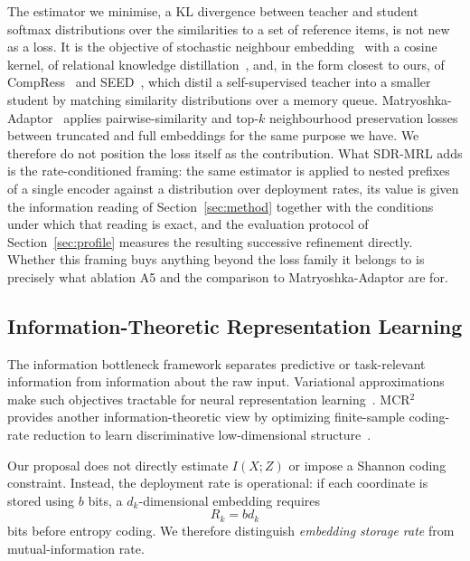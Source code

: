 \documentclass[11pt]{article}
\begin{document}
The estimator we minimise, a KL divergence between teacher and student softmax distributions over the similarities to a set of reference items, is not new as a loss.
It is the objective of stochastic neighbour embedding~\cite{hinton2002sne} with a cosine kernel, of relational knowledge distillation~\cite{park2019relational}, and, in the form closest to ours, of CompRess~\cite{koohpayegani2020compress} and SEED~\cite{fang2021seed}, which distil a self-supervised teacher into a smaller student by matching similarity distributions over a memory queue.
Matryoshka-Adaptor~\cite{yoon2024matryoshka} applies pairwise-similarity and top-$k$ neighbourhood preservation losses between truncated and full embeddings for the same purpose we have.
We therefore do not position the loss itself as the contribution.
What SDR-MRL adds is the rate-conditioned framing: the same estimator is applied to nested prefixes of a single encoder against a distribution over deployment rates, its value is given the information reading of Section~\ref{sec:method} together with the conditions under which that reading is exact, and the evaluation protocol of Section~\ref{sec:profile} measures the resulting successive refinement directly.
Whether this framing buys anything beyond the loss family it belongs to is precisely what ablation A5 and the comparison to Matryoshka-Adaptor are for.

\subsection{Information-Theoretic Representation Learning}

The information bottleneck framework separates predictive or task-relevant information from information about the raw input.
Variational approximations make such objectives tractable for neural representation learning~\cite{alemi2017vib}.
MCR$^2$ provides another information-theoretic view by optimizing finite-sample coding-rate reduction to learn discriminative low-dimensional structure~\cite{yu2020mcr2}.

Our proposal does not directly estimate $I(X;Z)$ or impose a Shannon coding constraint.
Instead, the deployment rate is operational:
if each coordinate is stored using $b$ bits, a $d_k$-dimensional embedding requires
\begin{equation}
    R_k = b d_k
\end{equation}
bits before entropy coding.
We therefore distinguish \emph{embedding storage rate} from mutual-information rate.
\end{document}
